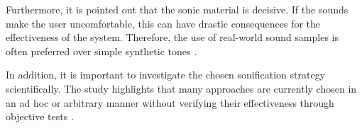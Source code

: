 Furthermore, it is pointed out that the sonic material is decisive. If the sounds make the user uncomfortable, this can have drastic consequences for the effectiveness of the system. Therefore, the use of real-world sound samples is often preferred over simple synthetic tones \cite{dubus2013systematic}.

In addition, it is important to investigate the chosen sonification strategy scientifically. The study highlights that many approaches are currently chosen in an ad hoc or arbitrary manner without verifying their effectiveness through objective tests \cite{dubus2013systematic}.
